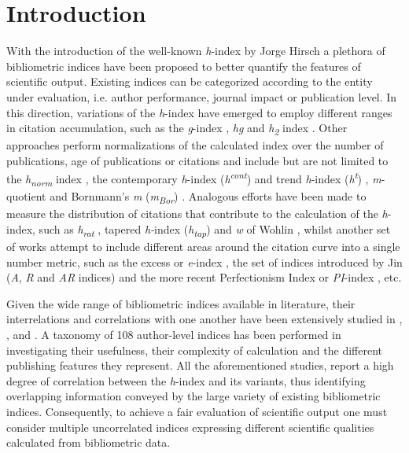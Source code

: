 \section{Introduction}\label{introduction}

With the introduction of the well-known \emph{h}-index by Jorge Hirsch a
plethora of bibliometric indices have been proposed to better quantify
the features of scientific output. Existing indices can be categorized
according to the entity under evaluation, i.e. author performance,
journal impact or publication level. In this direction, variations of
the \emph{h}-index have emerged to employ different ranges in citation
accumulation, such as the \emph{g}-index , \emph{hg} and
\emph{h\textsubscript{2}} index . Other approaches perform
normalizations of the calculated index over the number of publications,
age of publications or citations and include but are not limited to the
\emph{h\textsubscript{norm}} index , the contemporary \emph{h}-index
(\emph{h\textsuperscript{cont}}) and trend \emph{h}-index
(\emph{h\textsuperscript{t}}) , \emph{m}-quotient and Bornmann's
\emph{m} (\emph{m\textsubscript{Bor}}) . Analogous efforts have been
made to measure the distribution of citations that contribute to the
calculation of the \emph{h}-index, such as \emph{h\textsubscript{rat}} ,
tapered \emph{h-}index (\emph{h\textsubscript{tap}}) and \emph{w} of
Wohlin , whilst another set of works attempt to include different areas
around the citation curve into a single number metric, such as the
excess or \emph{e}-index , the set of indices introduced by Jin
(\emph{A}, \emph{R} and \emph{AR} indices) and the more recent
Perfectionism Index or \emph{PI}-index , etc.

Given the wide range of bibliometric indices available in literature,
their interrelations and correlations with one another have been
extensively studied in , , and . A taxonomy of 108 author-level indices
has been performed in investigating their usefulness, their complexity
of calculation and the different publishing features they represent. All
the aforementioned studies, report a high degree of correlation between
the \emph{h}-index and its variants, thus identifying overlapping
information conveyed by the large variety of existing bibliometric
indices. Consequently, to achieve a fair evaluation of scientific output
one must consider multiple uncorrelated indices expressing different
scientific qualities calculated from bibliometric data.

